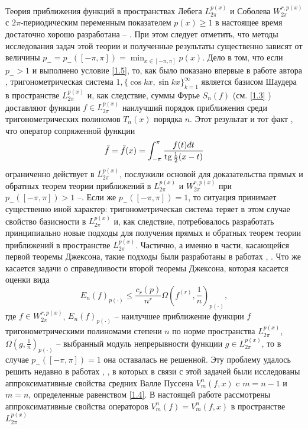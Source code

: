 Теория приближения функций в пространствах Лебега $L_{2\pi}^{p(x)}$  и Соболева $W^{r,p(x)}_{2\pi}$ с $2\pi$-периодическим переменным показателем $p(x)\ge1$ в настоящее время достаточно хорошо разработана \cite{Shar5}  -- \cite{Shar6}. При этом следует отметить, что методы исследования задач этой теории и полученные результаты существенно зависят от  величины $p_-=p_-([-\pi,\pi])=\min_{x\in[-\pi,\pi]}p(x)$. Дело в том, что если $p_->1$ и выполнено условие \eqref{1.5}, то, как было показано впервые в работе автора \cite{Shar2}, тригонометрическая система $1, \{\cos kx, \sin kx\}_{k=1}^\infty$ является базисом Шаудера в пространстве  $L_{2\pi}^{p(x)}$ и, как следствие, суммы Фурье $S_n(f)$ (см. \eqref{1.3} )  доставляют функции $f\in L_{2\pi}^{p(x)}$ наилучший порядок приближения среди тригонометрических полиномов $T_n(x)$ порядка $n$. Этот результат и тот факт  \cite{Shar2}, что оператор сопряженной функции
$$
\tilde f=\tilde f(x)=\int_{-\pi}^{\pi}{f(t)dt\over \operatorname{tg}\frac12(x-t)}
$$
 ограниченно действует в  $L_{2\pi}^{p(x)}$, послужили основой   для доказательства прямых и обратных теорем теории приближений в $L_{2\pi}^{p(x)}$ и $W_{2\pi}^{r,p(x)}$ при $p_-([-\pi,\pi])>1$  \cite{GuvIsr}--\cite{Chaich}. Если же  $p_-([-\pi,\pi])=1$, то ситуация принимает существенно иной характер: тригонометрическая система теряет в этом случае свойство базисности в $L_{2\pi}^{p(x)}$ и, как следствие, потребовалось \cite{Shar6} разработать принципиально новые подходы для получения прямых и обратных теорем теории приближений в пространстве $L_{2\pi}^{p(x)}$. Частично, а именно в части, касающейся первой теоремы Джексона, такие подходы были разработаны в работах \cite{Shar3}, \cite{Shar6}. Что же касается задачи о справедливости второй теоремы Джексона, которая касается оценки вида
 \begin{equation}\label{eq1.6}
   E_n(f)_{p(\cdot)}\le \frac{c_r(p)}{n^r}\Omega(f^{(r)},\frac1n)_{p(\cdot)},
 \end{equation}
 где $f\in W_{2\pi}^{r,p(x)}$, $E_n(f)_{p(\cdot)}$ -- наилучшее приближение функции $f$ тригонометрическими полиномами степени $n$ по норме пространства $L_{2\pi}^{p(x)}$, $\Omega(g,\frac1n)_{p(\cdot)}$ -- выбранный модуль непрерывности функции $g\in L_{2\pi}^{p(x)}$, то в случае $p_-([-\pi,\pi])=1$ она оставалась не решенной. Эту проблему удалось решить недавно в работах \cite{Shar7}, \cite{Shar8}, в которых в связи с этой задачей были  исследованы аппроксимативные свойства  средних Валле Пуссена $V_m^n(f,x)$ c $m=n-1$ и  $m=n$, определенные равенством   \eqref{1.4}. В настоящей работе рассмотрены аппроксимативные свойства операторов $V_m^n(f)=V_m^n(f,x)$ в пространстве $ L_{2\pi}^{p(x)}$
